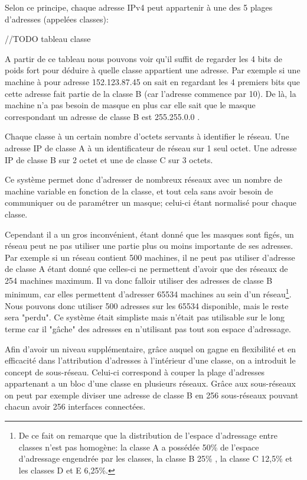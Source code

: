 Selon ce principe, chaque adresse IPv4 peut appartenir à une des 5 plages
d'adresses (appelées classes):

//TODO tableau classe

A partir de ce tableau nous pouvons voir qu'il suffit de regarder les 4 bits de
poids fort pour déduire à quelle classe appartient une adresse.  Par exemple si
une machine à pour adresse 152.123.87.45 on sait en regardant les 4 premiers
bits que cette adresse fait partie de la classe B (car l'adresse commence par
10). De là, la machine n'a pas besoin de masque en plus car elle sait que le
masque correspondant un adresse de classe B est 255.255.0.0 .

Chaque classe à un certain nombre d'octets servants à identifier le réseau. Une
adresse IP de classe A à un identificateur de réseau sur 1 seul octet. Une
adresse IP de classe B sur 2 octet et une de classe C sur 3 octets.

Ce système permet donc d'adresser de nombreux réseaux avec un nombre de machine
variable en fonction de la classe, et tout cela sans avoir besoin de
communiquer ou de paramétrer un masque; celui-ci étant normalisé pour chaque
classe.  

Cependant il a un gros inconvénient, étant donné que les masques sont
figés, un réseau peut ne pas utiliser une partie plus ou moins importante
de ses adresses. Par exemple si un réseau contient 500 machines, il ne peut pas
utiliser d'adresse de classe A étant donné que celles-ci ne permettent d'avoir
que des réseaux de 254 machines maximum. Il va donc falloir utiliser des
adresses de classe B minimum, car elles permettent d'adresser 65534 machines au
sein d'un réseau\footnote{
De ce fait on remarque que la distribution de l’espace d’adressage entre
classes n'est pas homogène: la classe A a possédée 50\% de l’espace
d'adressage engendrée par les classes, la classe B 25\% , la classe C 12,5\%  et
les classes D et E 6,25\%.}. Nous pouvons donc utiliser 500 adresses sur les 65534
disponible, mais le reste sera "perdu".  Ce système était simpliste mais
n'était pas utilisable sur le long terme car il "gâche" des adresses en
n'utilisant pas tout son espace d'adressage.

Afin d'avoir un niveau supplémentaire, grâce auquel on gagne en flexibilité et
en efficacité dans l'attribution d'adresses à l'intérieur d'une classe, on a
introduit le concept de sous-réseau. Celui-ci correspond à couper la plage
d'adresses appartenant a un bloc d'une classe en plusieurs réseaux. Grâce aux
sous-réseaux on peut par exemple diviser une adresse de classe B en 256
sous-réseaux pouvant chacun avoir 256 interfaces connectées. 



